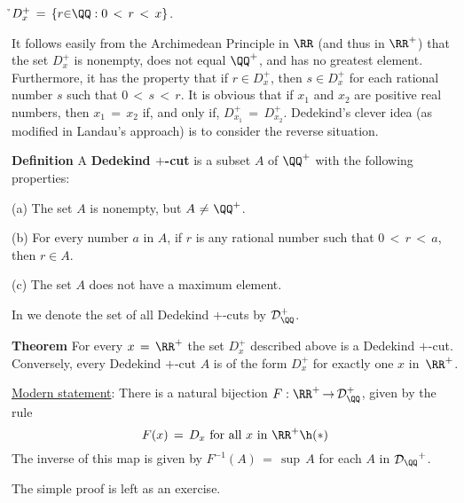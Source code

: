 {\VA

        \h $D_{x}^{+} \,=\, \{r{\in}{\QQ}: 0\,<\,r\,<\,x\}$.

\VA

\noindent It follows easily from the Archimedean Principle in ${\RR}$ (and thus in ${\RR}^{+}$)
    that the set $D_{x}^{+}$ is nonempty, does not equal ${\QQ}^{+}$, and has no greatest element.
    Furthermore, it has the property that if $r{\in}D_{x}^{+}$, then $s{\in}D_{x}^{+}$ for each rational number $s$ such that $0\,<\,s\,<\,r$.
    It is obvious that if $x_{1}$ and $x_{2}$ are positive real numbers, then $x_{1} \,=\, x_{2}$ if, and only if, $D_{x_{1}}^{+} \,=\, D_{x_{2}}^{+}$.
    Dedekind's clever idea (as modified in Landau's approach) is to consider the reverse situation.

\V

        {\bf Definition} A {\bf Dedekind $+$-cut} is a subset $A$ of ${\QQ}^{+}$ with the following properties:

\VA

        (a) The set $A$ is nonempty, but $A \,\,{\neq}\,\, {\QQ}^{+}$.

\VA

        (b) For every number $a$ in $A$, if $r$ is any rational number such that $0\,<\,r\,<\,a$, then $r{\in}A$.

\VA

        (c) The set $A$ does not have a maximum element.

\V

 \noindent In {\ThisText} we denote the set of all Dedekind $+$-cuts by ${\cal D}_{{\QQ}}^{+}$.

\VV

        {\bf Theorem} For every $x \,=\, {\RR}^{+}$ the set $D_{x}^{+}$ described above is a Dedekind $+$-cut.
    Conversely, every Dedekind $+$-cut $A$ is of the form $D_{x}^{+}$ for exactly one $x$ in~${\RR}^{+}$.

        \underline{Modern statement}: There is a natural bijection $F:{\RR}^{+} \,{\rightarrow}\, {\cal D}_{{\QQ}}^{+}$, given by the rule
        \begin{displaymath}
        F(x) \,=\, D_{x} \mbox{ for all $x$ in ${\RR}^{+}$} \h ({\ast})
        \end{displaymath}
    The inverse of this map is given by $F^{-1}(A) \,=\, {\sup}\,A$ for each $A$ in ${\cal D_{{\QQ}}}^{+}$.

\V

        The simple proof is left as an exercise.

}

